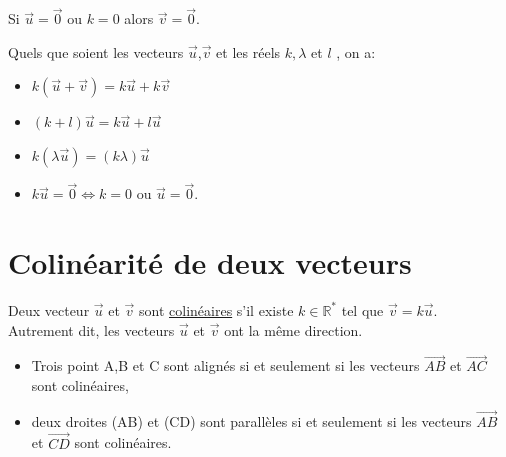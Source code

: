 \documentclass[french]{book}
\begin{document}
\begin{rem}
Si $\overrightarrow{u}=\overrightarrow{0}$ ou $k=0$ alors  $\overrightarrow{v}=\overrightarrow{0}$.
\end{rem}

\begin{prop}
Quels que soient les vecteurs $\overrightarrow{u}$,$\overrightarrow{v}$ et les réels $k, \lambda$ et $l$ , on a:

\begin{itemize}
\item $k(\overrightarrow{u}+\overrightarrow{v})=k\overrightarrow{u}+k\overrightarrow{v}$
\item $(k+l) \overrightarrow{u}= k\overrightarrow{u} + l \overrightarrow{u}$
\item $k(\lambda \overrightarrow{u})=(k\lambda)\overrightarrow{u}$
\item $k\overrightarrow{u}=\overrightarrow{0} \Longleftrightarrow k=0$ ou $\overrightarrow{u}=\overrightarrow{0}$.
\end{itemize}
\end{prop}
\newpage
\section{Colinéarité de deux vecteurs}

\begin{defn}
Deux vecteur $\overrightarrow{u}$ et $\overrightarrow{v}$ sont \underline{colinéaires} s'il existe $k \in \mathbb{R}^*$ tel que $\overrightarrow{v}=k\overrightarrow{u}$. \\

Autrement dit, les vecteurs $\overrightarrow{u}$ et $\overrightarrow{v}$ ont la même direction.

  
\end{defn}

\begin{prop}
\begin{itemize}
\item Trois point A,B et C sont alignés si et seulement si les vecteurs $\overrightarrow{AB}$ et $\overrightarrow{AC}$ sont colinéaires,
\item deux droites (AB) et (CD) sont parallèles si et seulement si les vecteurs $\overrightarrow{AB}$ et $\overrightarrow{CD}$ sont colinéaires.
\end{itemize}
\end{prop}
\end{document}
